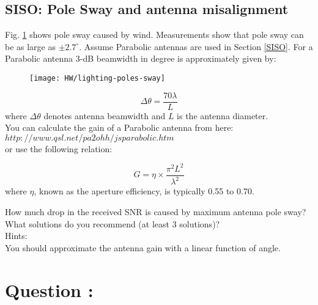 \documentclass[12pt,onecolumn,a4paper]{article}
\newcommand\question[1][\space]{
	\section[Question \numberstringnum{\thesection}]
	{Question \numberstringnum{\thesection}: #1}
}
\begin{document}
\subsection{SISO:  Pole Sway and antenna misalignment}
{\color{questioncolor}


Fig. \ref{fig:lighting-poles-sway} shows pole sway caused by wind. Measurements show that pole sway can be as large as $\pm2.7^\circ$. Assume Parabolic antennas are used in Section \ref{SISO}. For a Parabolic antenna 3-dB beamwidth in degree is approximately given by:

\begin{figure}[H]
	\centering
	\texttt{[image: HW/lighting-poles-sway]}
	\caption{}
	\label{fig:lighting-poles-sway}
\end{figure}


\begin{equation}
	\Delta\theta=\frac{70\lambda}{L}
\end{equation}
where $\Delta\theta$ denotes antenna beamwidth and $L$ is the antenna diameter.\\
You can calculate the gain of a Parabolic antenna from here:\\ $http://www.qsl.net/pa2ohh/jsparabolic.htm$
\\ or use the following relation: 

\begin{equation}
	G=\eta\times\frac{\pi^2L^2}{\lambda^2}
\end{equation}
where $\eta$, known as the aperture efficiency, is typically 0.55 to 0.70.


How much drop in the received SNR is caused by maximum antenna pole sway? What solutions do you recommend (at least 3 solutions)?\\

Hints: \\

You should approximate the antenna gain with a linear function of angle.

}






\FloatBarrier\question%
\end{document}
